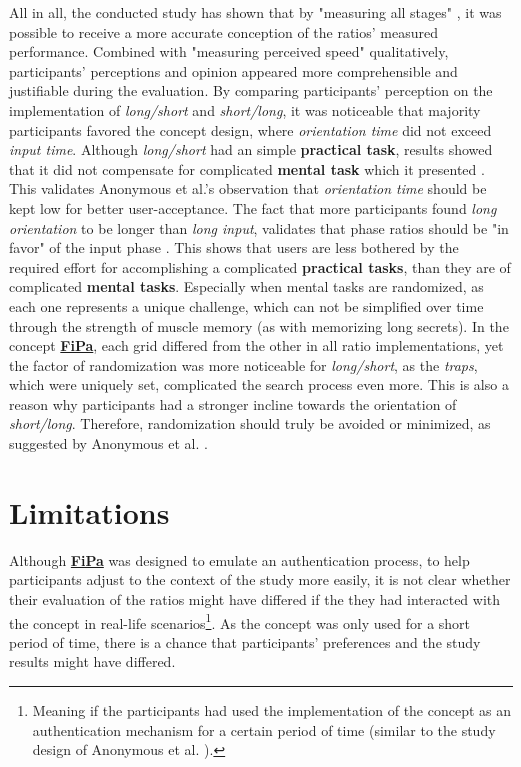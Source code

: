 All in all, the conducted study has shown that by "measuring all stages" \cite{anonymous}, it was possible to receive a more accurate conception of the ratios' measured performance. Combined with "measuring perceived speed" \cite{anonymous} qualitatively, participants' perceptions and opinion appeared more comprehensible and justifiable during the evaluation. By comparing participants' perception on the implementation of \textit{long/short} and \textit{short/long}, it was noticeable that majority participants favored the concept design, where \textit{orientation time} did not exceed \textit{input time}. Although \textit{long/short} had an simple \textbf{practical task}, results showed that it did not compensate for complicated \textbf{mental task} which it presented \cite{anonymous}. This validates Anonymous et al.'s \cite{anonymous} observation that \textit{orientation time} should be kept low for better user-acceptance. The fact that more participants found \textit{long orientation} to be longer than \textit{long input}, validates that phase ratios should be "in favor" of the input phase \cite{anonymous}. This shows that users are less bothered by the required effort for accomplishing a complicated \textbf{practical tasks}, than they are of complicated \textbf{mental tasks}. Especially when mental tasks are randomized, as each one represents a unique challenge, which can not be simplified over time through the strength of muscle memory (as with memorizing long secrets). In the concept \underline{\textbf{FiPa}}, each grid differed from the other in all ratio implementations, yet the factor of randomization was more noticeable for \textit{long/short}, as the \textit{traps}, which were uniquely set, complicated the search process even more. This is also a reason why participants had a stronger incline towards the orientation of \textit{short/long}. Therefore, randomization should truly be avoided or minimized, as suggested by Anonymous et al. \cite{anonymous}. \\


\section{Limitations}

Although \underline{\textbf{FiPa}} was designed to emulate an authentication process, to help participants adjust to the context of the study more easily, it is not clear whether their evaluation of the ratios might have differed if the they had interacted with the concept in real-life scenarios\footnote{Meaning if the participants had used the implementation of the concept as an authentication mechanism for a certain period of time (similar to the study design of Anonymous et al. \cite{anonymous}).}. As the concept was only used for a short period of time, there is a chance that participants' preferences and the study results might have differed.\\

